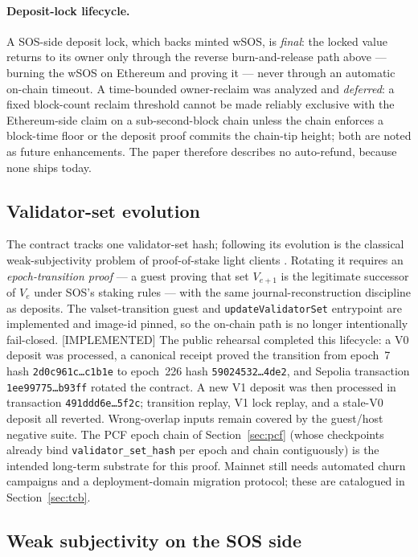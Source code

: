 \documentclass[11pt]{article}
\newcommand{\code}[1]{\texttt{#1}}
\newcommand{\statusI}{\textcolor{statgreen}{\textsf{\scriptsize[IMPLEMENTED]}}}
\theoremstyle{plain}
\theoremstyle{definition}
\theoremstyle{remark}
\begin{document}
\paragraph{Deposit-lock lifecycle.} A SOS-side deposit lock, which backs minted
wSOS, is \emph{final}: the locked value returns to its owner only through the
reverse burn-and-release path above --- burning the wSOS on Ethereum and
proving it --- never through an automatic on-chain timeout. A time-bounded
owner-reclaim was analyzed and \emph{deferred}: a fixed block-count reclaim
threshold cannot be made reliably exclusive with the Ethereum-side claim on a
sub-second-block chain unless the chain enforces a block-time floor or the
deposit proof commits the chain-tip height; both are noted as future
enhancements. The paper therefore describes no auto-refund, because none ships
today.

\subsection{Validator-set evolution}
\label{sec:valset-evolution}

The contract tracks one validator-set hash; following its evolution is the
classical weak-subjectivity problem of proof-of-stake light clients
\cite{weaksubj2014}. Rotating it requires an \emph{epoch-transition proof}
--- a guest proving that set $V_{e+1}$ is the legitimate successor of $V_e$
under SOS's staking rules --- with the same journal-reconstruction
discipline as deposits. The valset-transition guest and
\code{updateValidatorSet} entrypoint are implemented and image-id pinned, so
the on-chain path is no longer intentionally fail-closed. \statusI{} The public
rehearsal completed this lifecycle: a V0 deposit was processed, a canonical
receipt proved the transition from epoch~7 hash
\code{2d0c961c\ldots c1b1e} to epoch~226 hash
\code{59024532\ldots 4de2}, and Sepolia transaction
\code{1ee99775\ldots b93ff} rotated the contract. A new V1 deposit was then
processed in transaction \code{491ddd6e\ldots 5f2c}; transition replay, V1 lock
replay, and a stale-V0 deposit all reverted. Wrong-overlap inputs remain covered
by the guest/host negative suite. The PCF epoch chain of
Section~\ref{sec:pcf} (whose checkpoints already bind
\code{validator\_set\_hash} per epoch and chain contiguously) is the intended
long-term substrate for this proof. Mainnet still needs automated churn
campaigns and a deployment-domain migration protocol; these are catalogued in
Section~\ref{sec:tcb}.

\subsection{Weak subjectivity on the SOS side}
\label{sec:light-client-assumptions}
\end{document}
